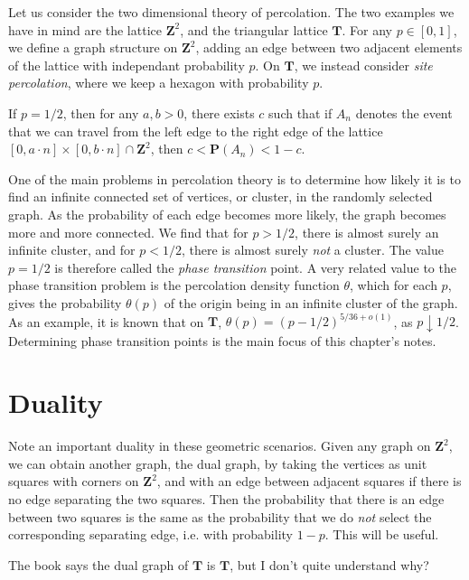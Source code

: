 Let us consider the two dimensional theory of percolation. The two examples we have in mind are the lattice $\mathbf{Z}^2$, and the triangular lattice $\mathbf{T}$. For any $p \in [0,1]$, we define a graph structure on $\mathbf{Z}^2$, adding an edge between two adjacent elements of the lattice with independant probability $p$. On $\mathbf{T}$, we instead consider {\it site percolation}, where we keep a hexagon with probability $p$.

\begin{theorem}
    If $p = 1/2$, then for any $a,b > 0$, there exists $c$ such that if $A_n$ denotes the event that we can travel from the left edge to the right edge of the lattice $[0,a \cdot n] \times [0, b \cdot n] \cap \mathbf{Z}^2$, then $c < \mathbf{P}(A_n) < 1 - c$.
\end{theorem}

One of the main problems in percolation theory is to determine how likely it is to find an infinite connected set of vertices, or cluster, in the randomly selected graph. As the probability of each edge becomes more likely, the graph becomes more and more connected. We find that for $p > 1/2$, there is almost surely an infinite cluster, and for $p < 1/2$, there is almost surely {\it not} a cluster. The value $p = 1/2$ is therefore called the {\it phase transition} point. A very related value to the phase transition problem is the percolation density function $\theta$, which for each $p$, gives the probability $\theta(p)$ of the origin being in an infinite cluster of the graph. As an example, it is known that on $\mathbf{T}$, $\theta(p) = (p - 1/2)^{5/36 + o(1)}$, as $p \downarrow 1/2$. Determining phase transition points is the main focus of this chapter's notes.

\section{Duality}

Note an important duality in these geometric scenarios. Given any graph on $\mathbf{Z}^2$, we can obtain another graph, the dual graph, by taking the vertices as unit squares with corners on $\mathbf{Z}^2$, and with an edge between adjacent squares if there is no edge separating the two squares. Then the probability that there is an edge between two squares is the same as the probability that we do {\it not} select the corresponding separating edge, i.e. with probability $1 - p$. This will be useful.

The book says the dual graph of $\mathbf{T}$ is $\mathbf{T}$, but I don't quite understand why?

